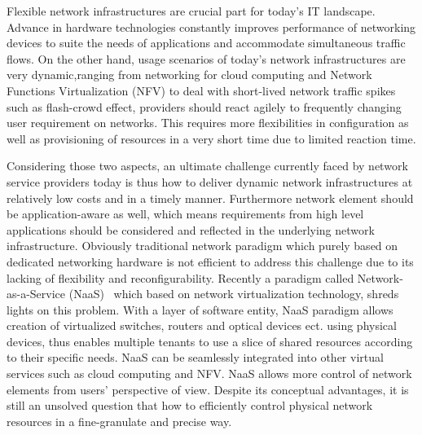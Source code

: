 \label{introduction}

Flexible network infrastructures are crucial part for today's IT landscape.
Advance in hardware technologies constantly improves performance of
networking devices to suite the needs of applications and accommodate
simultaneous traffic flows. On the other hand, usage scenarios of today's
network infrastructures are very dynamic,ranging from networking for cloud
computing and Network Functions Virtualization (NFV) to deal with short-lived
network traffic spikes such as flash-crowd effect, providers should react agilely to
frequently changing user requirement on networks. This requires more flexibilities
in configuration as well as provisioning of resources in a very short time due
to limited reaction time. 

Considering those two aspects, an ultimate challenge currently faced by network
service providers today is thus how to deliver dynamic network infrastructures
at relatively low costs and in a timely manner. Furthermore network element should be 
application-aware as well, which means requirements from high level applications should 
be considered and reflected in the underlying network infrastructure.
Obviously traditional network paradigm which purely based on dedicated
networking hardware is not efficient to address this challenge due to
its lacking of flexibility and reconfigurability. Recently a paradigm called
Network-as-a-Service (NaaS)~\cite{naas} which based on network virtualization
technology, shreds lights on this problem. With a layer of software entity,
NaaS paradigm allows creation of virtualized switches, routers and optical
devices ect. using physical devices, thus enables multiple tenants to use a
slice of shared resources according to their specific needs. NaaS can be
seamlessly integrated into other virtual services such as cloud computing and
NFV. NaaS allows more control of network elements from users' perspective of
view. Despite its conceptual advantages, it is still an unsolved question that
how to efficiently control physical network resources in a fine-granulate and precise 
way. 
%
%

